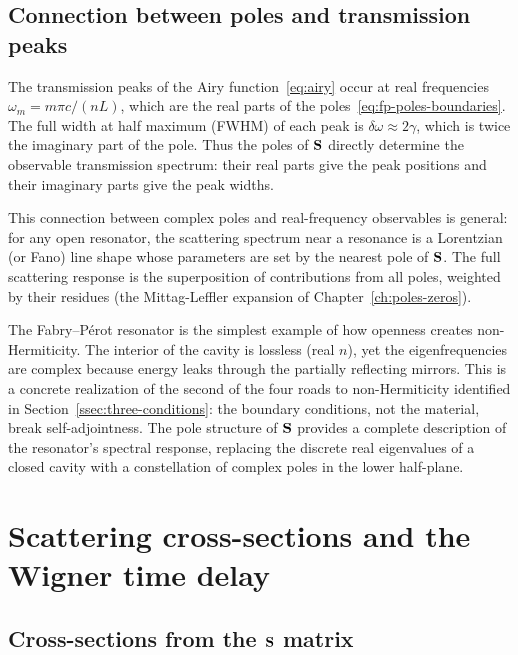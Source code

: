 \subsection{Connection between poles and transmission peaks}
\label{ssec:poles-transmission}

The transmission peaks of the Airy function~\eqref{eq:airy} occur at real
frequencies $\omega_m = m\pi c/(nL)$, which are the real parts of the
poles~\eqref{eq:fp-poles-boundaries}. The full width at half maximum
(FWHM) of each peak is $\delta\omega \approx 2\gamma$, which is twice
the imaginary part of the pole. Thus the poles of $\mathbf{S}$ directly
determine the observable transmission spectrum: their real parts give the
peak positions and their imaginary parts give the peak widths.

This connection between complex poles and real-frequency observables is
general: for any open resonator, the scattering spectrum near a resonance
is a Lorentzian (or Fano) line shape whose parameters are set by the
nearest pole of $\mathbf{S}$. The full scattering response is the
superposition of contributions from all poles, weighted by their residues
(the Mittag-Leffler expansion of Chapter~\ref{ch:poles-zeros}).

\begin{booknote}
The Fabry--P\'erot resonator is the simplest example of how openness
creates non-Hermiticity. The interior of the cavity is lossless (real
$n$), yet the eigenfrequencies are complex because energy leaks through
the partially reflecting mirrors. This is a concrete realization of the
second of the four roads to non-Hermiticity identified in
Section~\ref{ssec:three-conditions}: the boundary conditions, not the
material, break self-adjointness. The pole structure of $\mathbf{S}$
provides a complete description of the resonator's spectral response,
replacing the discrete real eigenvalues of a closed cavity with a
constellation of complex poles in the lower half-plane.
\end{booknote}


\section{Scattering cross-sections and the Wigner time delay}
\label{sec:cross-sections}

\subsection{Cross-sections from the $\mathbf{S}$ matrix}
\label{ssec:cross-from-s}

